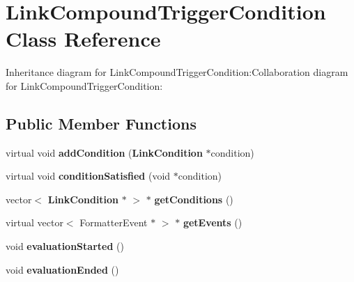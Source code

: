 \section{LinkCompoundTriggerCondition Class Reference}
\label{classbr_1_1pucrio_1_1telemidia_1_1ginga_1_1ncl_1_1model_1_1link_1_1LinkCompoundTriggerCondition}
Inheritance diagram for LinkCompoundTriggerCondition:Collaboration diagram for LinkCompoundTriggerCondition:\subsection*{Public Member Functions}
\begin{CompactItemize}
\item 
virtual void \textbf{addCondition} ({\bf LinkCondition} $\ast$condition)\label{classbr_1_1pucrio_1_1telemidia_1_1ginga_1_1ncl_1_1model_1_1link_1_1LinkCompoundTriggerCondition_ba0b7b13937c6d9da88431c4d20ce5ca}

\item 
virtual void \textbf{conditionSatisfied} (void $\ast$condition)\label{classbr_1_1pucrio_1_1telemidia_1_1ginga_1_1ncl_1_1model_1_1link_1_1LinkCompoundTriggerCondition_63883076dacc0fb2604a1dda72b9b6c0}

\item 
vector$<$ {\bf LinkCondition} $\ast$ $>$ $\ast$ \textbf{getConditions} ()\label{classbr_1_1pucrio_1_1telemidia_1_1ginga_1_1ncl_1_1model_1_1link_1_1LinkCompoundTriggerCondition_0eb2aac87143ef8e3d19e631dd756466}

\item 
virtual vector$<$ FormatterEvent $\ast$ $>$ $\ast$ \textbf{getEvents} ()\label{classbr_1_1pucrio_1_1telemidia_1_1ginga_1_1ncl_1_1model_1_1link_1_1LinkCompoundTriggerCondition_77d29bf7857d5b09d0ef4fb69cfc31cd}

\item 
void \textbf{evaluationStarted} ()\label{classbr_1_1pucrio_1_1telemidia_1_1ginga_1_1ncl_1_1model_1_1link_1_1LinkCompoundTriggerCondition_dba15d8c1d20e06651e6ddc5feae8447}

\item 
void \textbf{evaluationEnded} ()\label{classbr_1_1pucrio_1_1telemidia_1_1ginga_1_1ncl_1_1model_1_1link_1_1LinkCompoundTriggerCondition_d989631f55175df47acbd14b854a89e4}

\end{CompactItemize}
